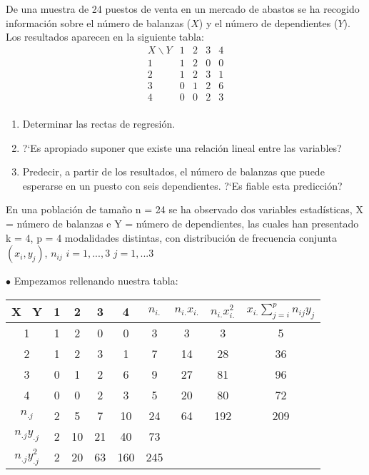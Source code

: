 \problem
	 De una muestra de 24 puestos de  venta en  un  mercado  de
	abastos  se ha recogido informaci\'on sobre el n\'umero de balanzas ($X$) y el n\'umero de dependientes ($Y$). Los resultados aparecen en la siguiente tabla:
	$$
	\begin{array}{c|cccc}
		X \backslash Y & 1  &  2 &  3 & 4\\ \hline
		1  &  1 &  2 &  0 & 0 \\
		2  &  1 &  2 &  3 & 1 \\
		3  &  0 &  1 &  2 & 6 \\
		4  &  0 &  0 &  2 & 3 \\
	\end{array}
	$$
	\begin{enumerate}
		\item Determinar las rectas de regresi{\'o}n.
		\item ?`Es apropiado suponer que existe una relaci{\'o}n  lineal  entre  las
		variables?
		\item  Predecir, a partir de los resultados, el n\'umero de balanzas que puede esperarse en un puesto con seis dependientes.  ?`Es fiable esta predicci{\'o}n?
	\end{enumerate}

	En una población de tamaño n = 24 se ha observado dos variables estadísticas,
	X = número de balanzas e Y = número de dependientes, las cuales han
	presentado k = 4, p = 4 modalidades distintas, con distribución de frecuencia
	conjunta $(x_{i},y_{j})$, $n_{ij}$ $ i = 1,...,3$ $ j=1,...3$
	
	$\bullet$ Empezamos rellenando nuestra tabla: \\
	
	\begin{tabular}{ | c | c | c | c | c | c | c | c| c| }
		
		
		\hline	
		X \ Y & 1 & 2 & 3 & 4  & $n_{i.}$ & $n_{i.}x_{i.}$ &  $n_{i.}x_{i.}^{2}$ & $x_{i.}\sum_{j=i}^{p}n_{ij}y_{j}$ \\ \hline
		1 & 1 & 2  & 0 & 0 & 3 & 3 & 3 & 5 \\
		2 & 1 & 2 & 3 & 1& 7 & 14 & 28 & 36 \\
		3 & 0 & 1 & 2 & 6 & 9 & 27 & 81 & 96 \\
		4& 0 & 0  & 2  & 3 & 5 & 20 & 80  & 72 \\
		$n_{.j}$& 2 & 5  & 7 & 10 & 24 & 64 & 192 & 209 \\ 
		$n_{.j}y_{.j}$ & 2 & 10 & 21 & 40 & 73 & & &  \\
		$n_{.j}y_{.j}^{2}$& 2 & 20 & 63 & 160 & 245 & & & \\\hline
		
		
	\end{tabular}
	\\ \\
	

